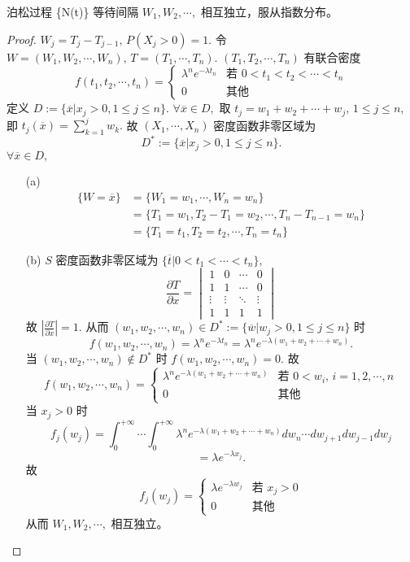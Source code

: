 \documentclass[lang=cn,10pt,thmcnt=section]{elegantbook}
\begin{document}
\begin{theorem}
	泊松过程 \{N(t)\} 等待间隔 $W_1, W_2, \cdots,$ 相互独立，服从指数分布。
\end{theorem}
\begin{proof}
	$W_j = T_j - T_{j-1}, \, P(X_j > 0) = 1.$
	令 $W = (W_1, W_2, \cdots, W_n), \, T = (T_1, \cdots, T_n).$
	$(T_1, T_2, \cdots, T_n)$ 有联合密度
	\[
	f(t_1, t_2, \cdots, t_n) = 
	\begin{cases} 
	\lambda^n e^{-\lambda t_n} & \text{若 } 0 < t_1 < t_2 < \cdots < t_n \\
	0 & \text{其他}
	\end{cases}
	\]
	定义 $D := \{\overline{x} | x_j > 0, 1 \leq j \leq n\}.$
	$\forall \overline{x} \in D, \text{ 取 } t_j = w_1 + w_2 + \cdots + w_j, \, 1 \leq j \leq n,$
	即 $t_j(\overline{x}) = \sum_{k=1}^{j} w_k.$
	故 $(X_1, \cdots, X_n)$ 密度函数非零区域为
	\[
	D^* := \{\overline{x} | x_j > 0, 1 \leq j \leq n\}.
	\]
	$\forall \overline{x} \in D,$
	\begin{itemize}
		\item[(a)]
		\begin{align*}
		\{W = \overline{x}\} &= \{W_1 = w_1, \cdots, W_n = w_n\} \\
		&= \{T_1 = w_1, T_2 - T_1 = w_2, \cdots, T_n - T_{n-1} = w_n\} \\
		&= \{T_1 = t_1, T_2 = t_2, \cdots, T_n = t_n\}
		\end{align*}
		\item[(b)] $S$ 密度函数非零区域为 $\{\overline{t} | 0 < t_1 < \cdots < t_n\},$
		\[
		\frac{\partial T}{\partial x} = 
		\begin{vmatrix}
		1 & 0 & \cdots & 0 \\
		1 & 1 & \cdots & 0 \\
		\vdots & \vdots & \ddots & \vdots \\
		1 & 1 & 1 & 1
		\end{vmatrix}
		\]
		故 $|\frac{\partial T}{\partial x}| = 1.$
		从而 $(w_1, w_2, \cdots, w_n) \in D^* := \{\overline{w} | w_j > 0, 1 \leq j \leq n\}$ 时
		\[
		f(w_1, w_2, \cdots, w_n) = \lambda^n e^{-\lambda t_n} = \lambda^n e^{-\lambda(w_1 + w_2 + \cdots + w_n)}.
		\]
		当 $(w_1, w_2, \cdots, w_n) \notin D^*$ 时 $f(w_1, w_2, \cdots, w_n) = 0.$
		故
		\[
		f(w_1, w_2, \cdots, w_n) = 
		\begin{cases} 
		\lambda^n e^{-\lambda(w_1 + w_2 + \cdots + w_n)} & \text{若 } 0 < w_i, \, i = 1, 2, \cdots, n \\
		0 & \text{其他}
		\end{cases}
		\]
		当 $x_j > 0$ 时
		\[
		f_j(w_j) = \int_0^{+\infty} \cdots \int_0^{+\infty} \lambda^n e^{-\lambda(w_1 + w_2 + \cdots + w_n)} dw_n \cdots dw_{j+1} dw_{j-1} dw_j
		\]
		\[
		= \lambda e^{-\lambda x_j}.
		\]
		故
		\[
		f_j(w_j) = 
		\begin{cases} 
		\lambda e^{-\lambda w_j} & \text{若 } x_j > 0 \\
		0 & \text{其他}
		\end{cases}
		\]
		从而 $W_1, W_2, \cdots, $ 相互独立。
	\end{itemize}
\end{proof}
\end{document}
